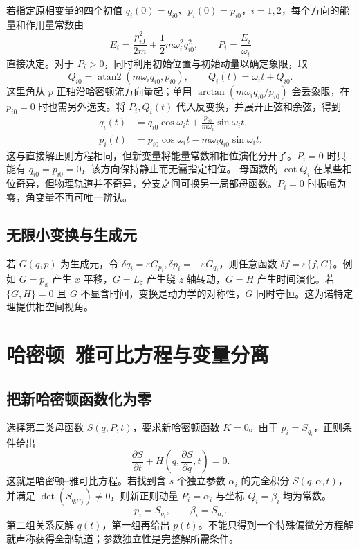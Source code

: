 \documentclass[UTF8,zihao=-4,fontset=fandol,a4paper]{ctexart}
\begin{document}
若指定原相变量的四个初值 $q_i(0)=q_{i0}$、$p_i(0)=p_{i0}$，$i=1,2$，每个方向的能量和作用量常数由
\[
E_i=\frac{p_{i0}^2}{2m}+\frac12m\omega_i^2q_{i0}^2,
\qquad P_i=\frac{E_i}{\omega_i}
\]
直接决定。对于 $P_i>0$，同时利用初始位置与初始动量以确定象限，取
\[
Q_{i0}=\operatorname{atan2}(m\omega_iq_{i0},p_{i0}),
\qquad Q_i(t)=\omega_it+Q_{i0}.
\]
这里角从 $p$ 正轴沿哈密顿流方向量起；单用 $\arctan(m\omega_iq_{i0}/p_{i0})$ 会丢象限，在 $p_{i0}=0$ 时也需另外选支。将 $P_i,Q_i(t)$ 代入反变换，并展开正弦和余弦，得到
\begin{align*}
q_i(t)&=q_{i0}\cos\omega_it+\frac{p_{i0}}{m\omega_i}\sin\omega_it,\\
p_i(t)&=p_{i0}\cos\omega_it-m\omega_iq_{i0}\sin\omega_it.
\end{align*}
这与直接解正则方程相同，但新变量将能量常数和相位演化分开了。$P_i=0$ 时只能有 $q_{i0}=p_{i0}=0$，该方向保持静止而无需指定相位。
母函数的 $\cot Q_i$ 在某些相位奇异，但物理轨道并不奇异，分支之间可换另一局部母函数。$P_i=0$ 时振幅为零，角变量不再可唯一辨认。
\subsection{无限小变换与生成元}
若 $G(q,p)$ 为生成元，令 $\delta q_i=\varepsilon G_{p_i},\delta p_i=-\varepsilon G_{q_i}$，则任意函数 $\delta f=\varepsilon\{f,G\}$。例如 $G=p_x$ 产生 $x$ 平移，$G=L_z$ 产生绕 $z$ 轴转动，$G=H$ 产生时间演化。若 $\{G,H\}=0$ 且 $G$ 不显含时间，变换是动力学的对称性，$G$ 同时守恒。这为诺特定理提供相空间视角。

\section{哈密顿--雅可比方程与变量分离}\label{sec:HJ}
\subsection{把新哈密顿函数化为零}
选择第二类母函数 $S(q,P,t)$，要求新哈密顿函数 $K=0$。由于 $p_i=S_{q_i}$，正则条件给出
\begin{equation}
\frac{\partial S}{\partial t}+H\left(q,\frac{\partial S}{\partial q},t\right)=0.\label{eq:HJ}
\end{equation}
这就是哈密顿--雅可比方程。若找到含 $s$ 个独立参数 $\alpha_i$ 的完全积分 $S(q,\alpha,t)$，并满足 $\det(S_{q_i\alpha_j})\ne0$，则新正则动量 $P_i=\alpha_i$ 与坐标 $Q_i=\beta_i$ 均为常数。
\[
p_i=S_{q_i},\qquad\beta_i=S_{\alpha_i}.
\]
第二组关系反解 $q(t)$，第一组再给出 $p(t)$。不能只得到一个特殊偏微分方程解就声称获得全部轨道；参数独立性是完整解所需条件。
\end{document}
